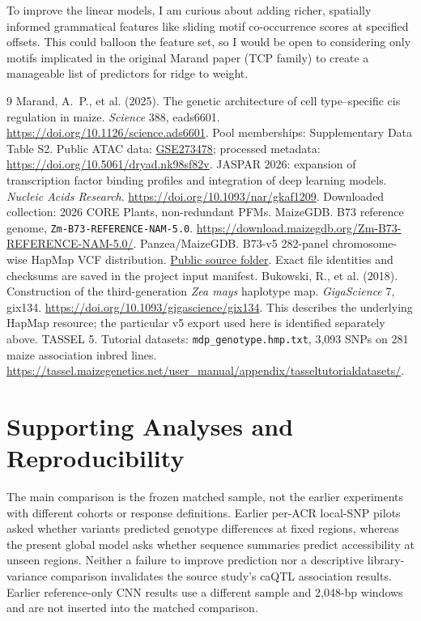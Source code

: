 \documentclass[10pt]{article}
\begin{document}
To improve the linear models, I am curious about adding richer, spatially informed grammatical features like sliding motif co-occurrence scores at specified offsets. This could balloon the feature set, so I would be open to considering only motifs implicated in the original Marand paper (TCP family) to create a manageable list of predictors for ridge to weight. 



\begin{thebibliography}{9}
 Marand, A.~P., et al. (2025). The genetic architecture of cell type--specific cis regulation in maize. \textit{Science} 388, eads6601. \url{https://doi.org/10.1126/science.ads6601}. Pool memberships: Supplementary Data Table S2. Public ATAC data: \href{https://www.ncbi.nlm.nih.gov/geo/query/acc.cgi?acc=GSE273478}{GSE273478}; processed metadata: \url{https://doi.org/10.5061/dryad.nk98sf82v}.
 JASPAR 2026: expansion of transcription factor binding profiles and integration of deep learning models. \textit{Nucleic Acids Research}. \url{https://doi.org/10.1093/nar/gkaf1209}. Downloaded collection: 2026 CORE Plants, non-redundant PFMs.
 MaizeGDB. B73 reference genome, \texttt{Zm-B73-REFERENCE-NAM-5.0}. \url{https://download.maizegdb.org/Zm-B73-REFERENCE-NAM-5.0/}.
 Panzea/MaizeGDB. B73-v5 282-panel chromosome-wise HapMap VCF distribution. \href{https://iastate.box.com/s/9edkm5f51q88ltzrb0hxaz4p36fdsr7q/folder/364949363629}{Public source folder}. Exact file identities and checksums are saved in the project input manifest.
 Bukowski, R., et al. (2018). Construction of the third-generation \textit{Zea mays} haplotype map. \textit{GigaScience} 7, gix134. \url{https://doi.org/10.1093/gigascience/gix134}. This describes the underlying HapMap resource; the particular v5 export used here is identified separately above.
 TASSEL 5. Tutorial datasets: \texttt{mdp\_genotype.hmp.txt}, 3,093 SNPs on 281 maize association inbred lines. \url{https://tassel.maizegenetics.net/user_manual/appendix/tasseltutorialdatasets/}.
\end{thebibliography}

\appendix
\section{Supporting Analyses and Reproducibility}
The main comparison is the frozen matched sample, not the earlier experiments with different cohorts or response definitions. Earlier per-ACR local-SNP pilots asked whether variants predicted genotype differences at fixed regions, whereas the present global model asks whether sequence summaries predict accessibility at unseen regions. Neither a failure to improve prediction nor a descriptive library-variance comparison invalidates the source study's caQTL association results. Earlier reference-only CNN results use a different sample and 2,048-bp windows and are not inserted into the matched comparison.
\end{document}
